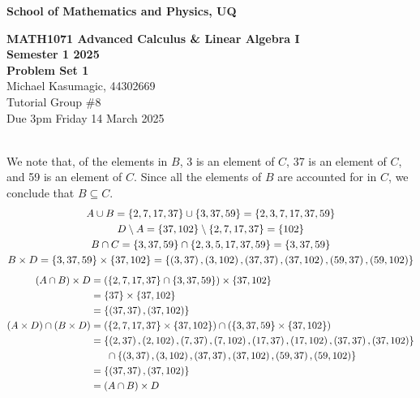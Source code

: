 \documentclass[a4paper,12pt]{report}
\begin{document}
\begin{center}
{\bf School of Mathematics and Physics, UQ}
\end{center}
\begin{center}
	{\large\bf MATH1071 Advanced Calculus \& Linear Algebra I \\ Semester 1 2025 \\ Problem Set 1} \\ \vspace{1em}
	Michael Kasumagic, 44302669 \\
	Tutorial Group \#8 \\
	Due 3pm Friday 14 March 2025
\end{center}

\sol \\
We note that, of the elements in $B$, 3 is an element of $C$, 37 is an element of $C$, and 59 is an element of $C$. Since all the elements of $B$ are accounted for in $C$, we conclude that $B\subseteq C$.
\begin{gather*}
	A\cup B = \left\lbrace 2,7,17,37 \right\rbrace\cup\left\lbrace 3,37,59 \right\rbrace = \left\lbrace 2,3,7,17,37,59 \right\rbrace \\
	D\setminus A = \left\lbrace 37,102 \right\rbrace\setminus\left\lbrace 2,7,17,37 \right\rbrace = \left\lbrace 102 \right\rbrace \\
	B\cap C = \left\lbrace 3,37,59 \right\rbrace\cap\left\lbrace 2,3,5,17,37,59 \right\rbrace = \left\lbrace 3, 37, 59 \right\rbrace \\
	B\times D = \left\lbrace 3,37,59 \right\rbrace\times\left\lbrace 37,102 \right\rbrace = \left\lbrace \left( 3,37 \right),\left( 3,102 \right),\left( 37,37 \right),\left( 37,102 \right),\left( 59,37 \right),\left( 59,102 \right) \right\rbrace
\end{gather*}
\begin{align*}
	(A\cap B)\times D &= \left( \left\lbrace 2,7,17,37 \right\rbrace\cap\left\lbrace 3,37,59 \right\rbrace \right)\times\left\lbrace 37,102 \right\rbrace \\
		&= \left\lbrace 37 \right\rbrace\times\left\lbrace 37,102 \right\rbrace \\
		&= \left\lbrace \left( 37,37 \right),\left( 37,102 \right) \right\rbrace \\
	\left( A\times D \right)\cap\left( B\times D \right) &= \left( \left\lbrace 2,7,17,37 \right\rbrace\times \left\lbrace 37,102 \right\rbrace \right)\cap\left( \left\lbrace 3,37,59 \right\rbrace\times \left\lbrace 37,102 \right\rbrace \right) \\
		&= \left\lbrace \left( 2,37 \right),\left( 2,102 \right),\left( 7,37 \right),\left( 7,102 \right),\left( 17,37 \right),\left( 17,102 \right),\left( 37,37 \right),\left( 37,102 \right) \right\rbrace \\
		&\phantom{a=} \cap\left\lbrace \left( 3,37 \right),\left( 3,102 \right),\left( 37,37 \right),\left( 37,102 \right),\left( 59,37 \right),\left( 59,102 \right) \right\rbrace \\
		&= \left\lbrace \left( 37,37 \right),\left( 37,102 \right) \right\rbrace \\
		&= \left( A\cap B \right)\times D
\end{align*}
\end{document}
